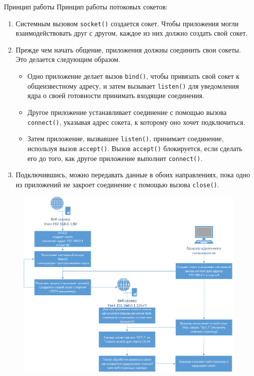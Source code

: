 \documentclass{beamer}
\begin{document}
\begin{frame}[shrink]{Принцип работы}
    Принцип работы потоковых сокетов:
    \begin{enumerate}
        \item Системным вызовом \texttt{socket()} создается сокет. Чтобы приложения могли взаимодействовать друг с другом, каждое из них должно создать свой сокет.
        \item Прежде чем начать общение, приложения должны соединить свои сокеты. Это делается следующим образом.
        \begin{itemize}
            \item Одно приложение делает вызов \texttt{bind()}, чтобы привязать свой сокет к общеизвестному адресу, и затем вызывает \texttt{listen()} для уведомления ядра о своей готовности принимать входящие соединения.
            \item Другое приложение устанавливает соединение с помощью вызова \texttt{connect()}, указывая адрес сокета, к которому оно хочет подключиться. 
            \item Затем приложение, вызвавшее \texttt{listen()}, принимает соединение, используя вызов \texttt{accept()}. Вызов \texttt{accept()} блокируется, если сделать его до того, как другое приложение выполнит \texttt{connect()}.
        \end{itemize}
        \item Подключившись, можно передавать данные в обоих направлениях, пока одно из приложений не закроет соединение с помощью вызова \texttt{close()}. 
    \end{enumerate}
\end{frame}

\begin{frame}
	\begin{figure}[h]
		\centering
	\includegraphics[scale=0.4]{images/lec12-pic05.png}
	\end{figure}
\end{frame}
\end{document}
